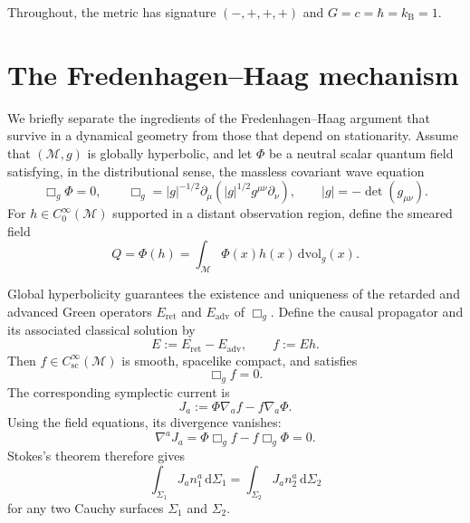 \documentclass[11pt,a4paper]{article}
\theoremstyle{definition}
\theoremstyle{remark}
\newcommand{\M}{\mathcal M}
\newcommand{\Cinf}{C_0^\infty}
\newcommand{\dd}{\mathrm d}
\begin{document}
	Throughout, the metric has signature $(-,+,+,+)$ and
	$G=c=\hbar=k_{\mathrm B}=1$.
	
	\section{The Fredenhagen--Haag mechanism}
	\label{sec:FH}
	
	We briefly separate the ingredients of the Fredenhagen--Haag argument that
	survive in a dynamical geometry from those that depend on stationarity.
	Assume that $(\M,g)$ is globally hyperbolic, and let $\Phi$ be a neutral
	scalar quantum field satisfying, in the distributional sense, the massless
	covariant wave equation
	\begin{equation}
		\Box_g\Phi=0,
		\qquad
		\Box_g
		=
		|g|^{-1/2}\partial_\mu
		\left(
		|g|^{1/2}g^{\mu\nu}\partial_\nu
		\right),
		\qquad
		|g|=-\det(g_{\mu\nu}).
		\label{eq:massless-wave-equation}
	\end{equation}
	For $h\in\Cinf(\M)$ supported in a distant observation region, define the
	smeared field
	\begin{equation}
		Q=\Phi(h)
		=\int_{\M}\Phi(x)h(x)\,\dd\mathrm{vol}_g(x).
		\label{eq:smeared-detector}
	\end{equation}
	
	Global hyperbolicity guarantees the existence and uniqueness of the retarded
	and advanced Green operators $E_{\mathrm{ret}}$ and $E_{\mathrm{adv}}$ of
	$\Box_g$.  Define the causal propagator and its associated classical solution
	by
	\begin{equation}
		E:=E_{\mathrm{ret}}-E_{\mathrm{adv}},
		\qquad
		f:=Eh.
		\label{eq:causal-solution}
	\end{equation}
	Then $f\in C^\infty_{\mathrm{sc}}(\M)$ is smooth, spacelike compact, and
	satisfies
	\[
	\Box_g f=0.
	\]
	The corresponding symplectic current is
	\begin{equation}
		J_a:=\Phi\nabla_a f-f\nabla_a\Phi.
		\label{eq:symplectic-current}
	\end{equation}
	Using the field equations, its divergence vanishes:
	\begin{equation}
		\nabla^aJ_a
		=
		\Phi\Box_gf-f\Box_g\Phi
		=0.
		\label{eq:symplectic-current-conservation}
	\end{equation}
	Stokes's theorem therefore gives
	\begin{equation}
		\int_{\Sigma_1}J_a n_1^a\,\dd\Sigma_1
		=
		\int_{\Sigma_2}J_a n_2^a\,\dd\Sigma_2
		\label{eq:symplectic-conservation}
	\end{equation}
	for any two Cauchy surfaces $\Sigma_1$ and $\Sigma_2$.
	
\end{document}
